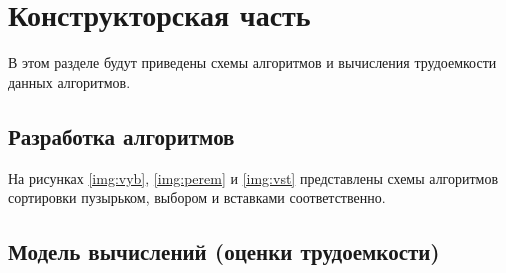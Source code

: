 \chapter{Конструкторская часть}
В этом разделе будут приведены схемы алгоритмов и вычисления трудоемкости данных алгоритмов.





\section{Разработка алгоритмов}

На рисунках  \ref{img:vyb}, \ref{img:perem} и \ref{img:vst} представлены схемы алгоритмов сортировки пузырьком, выбором и вставками соответственно.



\section{Модель вычислений (оценки трудоемкости)}

